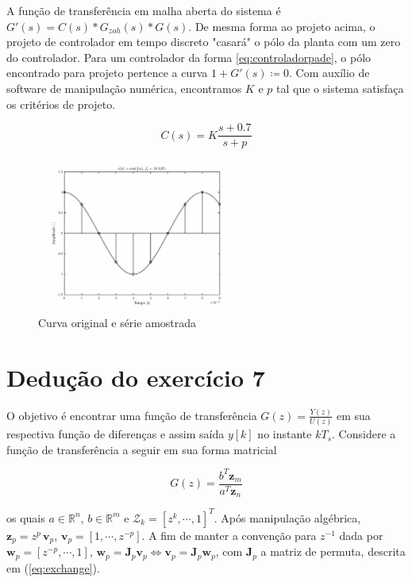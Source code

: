 \documentclass[twoside, fleqn]{article}
\begin{document}
    A função de transferência em malha aberta do sistema é $G'(s) = C(s)*G_{zoh}(s)*G(s)$. De mesma forma ao projeto acima, o projeto de controlador em tempo discreto "casará" o pólo da planta com um zero do controlador. Para um controlador da forma \eqref{eq:controladorpade}, o pólo encontrado para projeto pertence a curva $1 + G'(s) \coloneqq 0$.   Com auxílio de software de manipulação numérica, encontramos $K$ e $p$ tal que o sistema satisfaça os critérios de  projeto. 

    \begin{equation}
    \label{eq:controladorpade}
        C(s) = K \frac{s + 0.7}{s + p}
    \end{equation}
    
    
    \begin{figure}[H]
    	\center
    	\includegraphics[width=0.6\textwidth]{./images/ex1a.eps}
    	\caption{Curva original e série amostrada}
    	\label{fig:ex1}
    \end{figure}
    

\section*{Dedução do exercício 7}
\label{sec:deducao7}

    O objetivo é encontrar uma função de transferência $G(z) = \frac{Y(z)}{U(z)}$ em sua respectiva função de diferenças e assim saída $y[k]$ no instante $k T_s$. Considere a função de transferência a seguir em sua forma matricial
    
        \begin{equation}
            G(z) = \frac{b^T \textbf{z}_m}{a^T \textbf{z}_n}    
            \label{eq:Gz}
        \end{equation}
    
    os quais $a \in \mathbb{R}^n$, $b \in \mathbb{R}^m$ e $\mathcal{Z}_k = \left[z^k, \cdots, 1\right]^T$. Após manipulação algébrica, $\textbf{z}_p = z^p \, \textbf{v}_p$, $\textbf{v}_p = [1, \cdots, z^{-p}]$. A fim de manter a convenção para $z^{-1}$ dada por $\textbf{w}_p =  [z^{-p}, \cdots, 1]$, $\textbf{w}_p = \textbf{J}_p \textbf{v}_p \Leftrightarrow{\textbf{v}_p = \textbf{J}_p \textbf{w}_p}$, com $\textbf{J}_p$ a matriz de permuta, descrita em (\ref{eq:exchange}).
    
\end{document}
